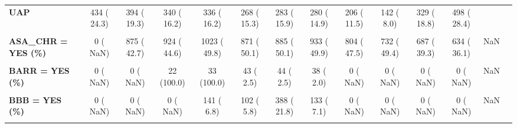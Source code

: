 \documentclass[
]{article}
\begin{document}
\begin{table}[H]
\begin{tabular}[t]{>{\raggedright\arraybackslash}p{5em}ccccccccccccc}
\textbf{UAP} & 434 ( 24.3) & 394 ( 19.3) & 340 ( 16.2) & 336 ( 16.2) & 268 ( 15.3) & 283 ( 15.9) & 280 ( 14.9) & 206 ( 11.5) & 142 (  8.0) & 329 ( 18.8) & 498 ( 28.4) &  & \\
\textbf{\cellcolor{gray!10}{ARR\_REP (mean (SD))}} & \cellcolor{gray!10}{85.21 (145.73)} & \cellcolor{gray!10}{186.43 (587.39)} & \cellcolor{gray!10}{160.44 (345.34)} & \cellcolor{gray!10}{128.33 (497.43)} & \cellcolor{gray!10}{96.26 (141.99)} & \cellcolor{gray!10}{97.71 (231.70)} & \cellcolor{gray!10}{96.45 (164.23)} & \cellcolor{gray!10}{79.65 (102.65)} & \cellcolor{gray!10}{67.65 (79.24)} & \cellcolor{gray!10}{117.12 (233.21)} & \cellcolor{gray!10}{131.21 (345.20)} & \cellcolor{gray!10}{<0.001} & \cellcolor{gray!10}{}\\
\textbf{ASA\_CHR = YES (\%)} & 0 (  NaN) & 875 ( 42.7) & 924 ( 44.6) & 1023 ( 49.8) & 871 ( 50.1) & 885 ( 50.1) & 933 ( 49.9) & 804 ( 47.5) & 732 ( 49.4) & 687 ( 39.3) & 634 ( 36.1) & NaN & \\
\textbf{\cellcolor{gray!10}{BARE = YES (\%)}} & \cellcolor{gray!10}{0 (  NaN)} & \cellcolor{gray!10}{0 (  NaN)} & \cellcolor{gray!10}{822 ( 80.0)} & \cellcolor{gray!10}{775 ( 64.5)} & \cellcolor{gray!10}{861 ( 79.1)} & \cellcolor{gray!10}{845 ( 73.4)} & \cellcolor{gray!10}{503 ( 42.0)} & \cellcolor{gray!10}{36 (  3.0)} & \cellcolor{gray!10}{9 (  0.8)} & \cellcolor{gray!10}{0 (  NaN)} & \cellcolor{gray!10}{0 (  NaN)} & \cellcolor{gray!10}{NaN} & \cellcolor{gray!10}{}\\
\textbf{BARR = YES (\%)} & 0 (  NaN) & 0 (  NaN) & 22 (100.0) & 33 (100.0) & 43 (  2.5) & 44 (  2.5) & 38 (  2.0) & 0 (  NaN) & 0 (  NaN) & 0 (  NaN) & 0 (  NaN) & NaN & \\
\textbf{\cellcolor{gray!10}{BASA = YES (\%)}} & \cellcolor{gray!10}{480 (100.0)} & \cellcolor{gray!10}{550 (100.0)} & \cellcolor{gray!10}{598 (100.0)} & \cellcolor{gray!10}{1402 ( 67.6)} & \cellcolor{gray!10}{1254 ( 71.8)} & \cellcolor{gray!10}{1176 ( 66.1)} & \cellcolor{gray!10}{1354 ( 71.8)} & \cellcolor{gray!10}{1393 ( 77.8)} & \cellcolor{gray!10}{1271 ( 71.5)} & \cellcolor{gray!10}{1202 ( 89.5)} & \cellcolor{gray!10}{1095 ( 83.1)} & \cellcolor{gray!10}{<0.001} & \cellcolor{gray!10}{}\\
\textbf{BBB = YES (\%)} & 0 (  NaN) & 0 (  NaN) & 0 (  NaN) & 141 (  6.8) & 102 (  5.8) & 388 ( 21.8) & 133 (  7.1) & 0 (  NaN) & 0 (  NaN) & 0 (  NaN) & 0 (  NaN) & NaN & \\
\textbf{\cellcolor{gray!10}{BBL\_CHR = YES (\%)}} & \cellcolor{gray!10}{0 (  NaN)} & \cellcolor{gray!10}{603 ( 29.4)} & \cellcolor{gray!10}{755 ( 36.5)} & \cellcolor{gray!10}{764 ( 37.3)} & \cellcolor{gray!10}{654 ( 37.6)} & \cellcolor{gray!10}{692 ( 39.3)} & \cellcolor{gray!10}{700 ( 37.5)} & \cellcolor{gray!10}{624 ( 39.8)} & \cellcolor{gray!10}{555 ( 44.1)} & \cellcolor{gray!10}{501 ( 28.6)} & \cellcolor{gray!10}{432 ( 24.6)} & \cellcolor{gray!10}{NaN} & \cellcolor{gray!10}{}\\

\end{tabular}
\end{table}
\end{document}
